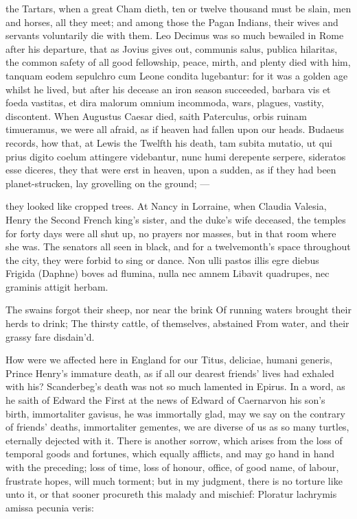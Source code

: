 {the Tartars, when a great Cham dieth, ten or twelve thousand must
be slain, men and horses, all they meet; and among those the
Pagan Indians, their wives and servants voluntarily die with
them. Leo Decimus was so much bewailed in Rome after his departure,
that as Jovius gives out, communis salus, publica hilaritas, the
common safety of all good fellowship, peace, mirth, and plenty died
with him, tanquam eodem sepulchro cum Leone condita lugebantur: for it
was a golden age whilst he lived, but after his decease an iron
season succeeded, barbara vis et foeda vastitas, et dira malorum omnium
incommoda, wars, plagues, vastity, discontent. When Augustus Caesar
died, saith Paterculus, orbis ruinam timueramus, we were all afraid, as
if heaven had fallen upon our heads. Budaeus records, how that,
at Lewis the Twelfth his death, tam subita mutatio, ut qui prius digito
coelum attingere videbantur, nunc humi derepente serpere, sideratos
esse diceres, they that were erst in heaven, upon a sudden, as if they
had been planet-strucken, lay grovelling on the ground;
---

they looked like cropped trees. At Nancy in Lorraine, when
Claudia Valesia, Henry the Second French king's sister, and the duke's
wife deceased, the temples for forty days were all shut up, no prayers
nor masses, but in that room where she was. The senators all seen in
black, and for a twelvemonth's space throughout the city, they were
forbid to sing or dance.
Non ulli pastos illis egre diebus
Frigida (Daphne) boves ad flumina, nulla nec amnem
Libavit quadrupes, nec graminis attigit herbam.

The swains forgot their sheep, nor near the brink
Of running waters brought their herds to drink;
The thirsty cattle, of themselves, abstained
From water, and their grassy fare disdain'd.

How were we affected here in England for our Titus, deliciae, humani
generis, Prince Henry's immature death, as if all our dearest friends'
lives had exhaled with his? Scanderbeg's death was not so much
lamented in Epirus. In a word, as he saith of Edward the First at
the news of Edward of Caernarvon his son's birth, immortaliter gavisus,
he was immortally glad, may we say on the contrary of friends' deaths,
immortaliter gementes, we are diverse of us as so many turtles,
eternally dejected with it.
There is another sorrow, which arises from the loss of temporal goods
and fortunes, which equally afflicts, and may go hand in hand with the
preceding; loss of time, loss of honour, office, of good name, of
labour, frustrate hopes, will much torment; but in my judgment, there
is no torture like unto it, or that sooner procureth this malady and
mischief:
Ploratur lachrymis amissa pecunia veris:

}
